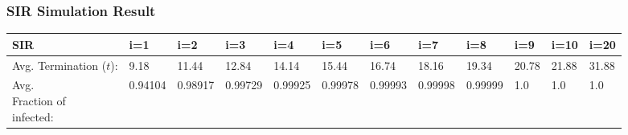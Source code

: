 \documentclass{subfile}
\begin{document}
  \subsubsection{SIR Simulation Result}
  {\small
  \begin{adjustbox}{max width=1.2\textwidth,center}
  \begin{tabular}{|l|l|l|l|l|l|l|l|l|l|l|l|}
    \hline
    SIR & i=1& i=2& i=3& i=4& i=5& i=6& i=7& i=8& i=9& i=10& i=20\\
    \hline
    \makecell{Avg.\\Termination\\(\(t\)):} & 9.18&
11.44&
12.84&
14.14&
15.44&
16.74&
18.16&
19.34&
20.78&
21.88&
31.88\\
    \hline
    \makecell{Avg.\\Fraction of\\ infected:}&0.94104&
0.98917&
0.99729&
0.99925&
0.99978&
0.99993&
0.99998&
0.99999&
1.0&
1.0&
1.0\\
    \hline
  \end{tabular}
  \end{adjustbox}}
\end{document}

